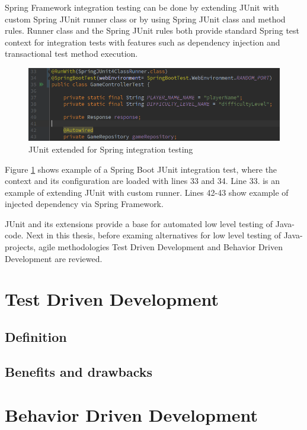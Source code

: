     Spring Framework integration testing can be done by extending JUnit with custom Spring JUnit runner class or by using Spring JUnit class and
    method rules. Runner class and the Spring JUnit rules both provide standard Spring test context
    for integration tests with features such as dependency injection and transactional test method execution. ~\cite{springintegration}

    \begin{figure}[ht]
      \begin{center}
        \includegraphics[width=13.5cm]{images/springrunner.png}
        \caption{JUnit extended for Spring integration testing}
        \label{fig:springrunner}
      \end{center}
    \end{figure}

    Figure \ref{fig:springrunner} shows example of a Spring Boot JUnit integration test, where the context and its configuration are
    loaded with lines 33 and 34. Line 33. is an example of extending JUnit with custom runner. Lines 42-43 show example of injected dependency
    via Spring Framework.

    JUnit and its extensions provide a base for automated low level testing of Java-code.
    Next in this thesis, before examing alternatives for low level testing of Java-projects, agile methodologies Test Driven Development
    and Behavior Driven Development are reviewed.

\section{Test Driven Development} %
    \subsection{Definition}
    \subsection{Benefits and drawbacks}

\section{Behavior Driven Development} %
